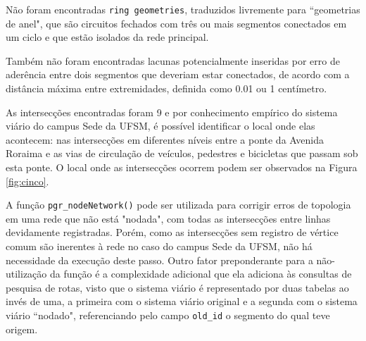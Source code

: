 \documentclass[oneside,openright,12pt]{ufsm_2015} %
\begin{document}
Não foram encontradas {\tt ring geometries}, traduzidos livremente para ``geometrias de anel", que são circuitos fechados com três ou mais segmentos conectados em um ciclo e que estão isolados da rede principal. 

Também não foram encontradas lacunas potencialmente inseridas por erro de aderência entre dois segmentos que deveriam estar conectados, de acordo com a distância máxima entre extremidades, definida como 0.01 ou 1 centímetro.

As intersecções encontradas foram 9 e por conhecimento empírico do sistema viário do campus Sede da UFSM, é possível identificar o local onde elas acontecem: nas intersecções em diferentes níveis entre a ponte da Avenida Roraima e as vias de circulação de veículos, pedestres e bicicletas que passam sob esta ponte. O local onde as intersecções ocorrem podem ser observados na Figura \ref{fig:cinco}.

A função {\tt pgr\_nodeNetwork()} pode ser utilizada para corrigir erros de topologia em uma rede que não está "nodada", com todas as intersecções entre linhas devidamente registradas. Porém, como as intersecções sem registro de vértice comum são inerentes à rede no caso do campus Sede da UFSM, não há necessidade da execução deste passo.
Outro fator preponderante para a não-utilização da função é a complexidade adicional que ela adiciona às consultas de pesquisa de rotas, visto que o sistema viário é representado por duas tabelas ao invés de uma, a primeira com o sistema viário original e a segunda com o sistema viário ``nodado", referenciando pelo campo {\tt old\_id} o segmento do qual teve origem.
\end{document}
